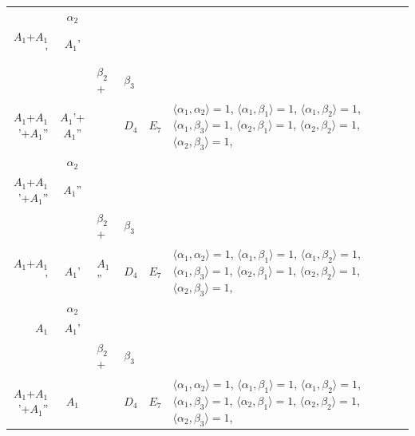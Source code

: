 \documentclass[12pt]{report}
\begin{document}
\begin{appendix}
{\begin{longtable}{rcl p{1cm}p{1cm}p{3cm} }
\\
\begin{tabular}{cc}$\alpha_1$+ & $\alpha_2$\\\tiny{ $A_1$+$A_1$' } & \tiny{ $A_1$' }\end{tabular} &\begin{tabular}{c} = \\~ \end{tabular} & \begin{tabular}{ccc}$\beta_1$+ & $\beta_2$+ & $\beta_3$\\\tiny{ $A_1$+$A_1$'+$A_1$'' } & \tiny{ $A_1$'+$A_1$'' } & \tiny{  }\end{tabular} & $D_4$ & $E_7$ & $\langle\alpha_1, \alpha_2\rangle=1$,  $\langle\alpha_1, \beta_1\rangle=1$, $\langle\alpha_1, \beta_2\rangle=1$, $\langle\alpha_1, \beta_3\rangle=1$, $\langle\alpha_2, \beta_1\rangle=1$, $\langle\alpha_2, \beta_2\rangle=1$, $\langle\alpha_2, \beta_3\rangle=1$, 
\\
\begin{tabular}{cc}$\alpha_1$+ & $\alpha_2$\\\tiny{ $A_1$+$A_1$'+$A_1$'' } & \tiny{ $A_1$'' }\end{tabular} &\begin{tabular}{c} = \\~ \end{tabular} & \begin{tabular}{ccc}$\beta_1$+ & $\beta_2$+ & $\beta_3$\\\tiny{ $A_1$+$A_1$' } & \tiny{ $A_1$' } & \tiny{ $A_1$'' }\end{tabular} & $D_4$ & $E_7$ & $\langle\alpha_1, \alpha_2\rangle=1$,  $\langle\alpha_1, \beta_1\rangle=1$, $\langle\alpha_1, \beta_2\rangle=1$, $\langle\alpha_1, \beta_3\rangle=1$, $\langle\alpha_2, \beta_1\rangle=1$, $\langle\alpha_2, \beta_2\rangle=1$, $\langle\alpha_2, \beta_3\rangle=1$, 
\\
\begin{tabular}{cc}$\alpha_1$+ & $\alpha_2$\\\tiny{ $A_1$ } & \tiny{ $A_1$' }\end{tabular} &\begin{tabular}{c} = \\~ \end{tabular} & \begin{tabular}{ccc}$\beta_1$+ & $\beta_2$+ & $\beta_3$\\\tiny{ $A_1$+$A_1$'+$A_1$'' } & \tiny{ $A_1$ } & \tiny{  }\end{tabular} & $D_4$ & $E_7$ & $\langle\alpha_1, \alpha_2\rangle=1$,  $\langle\alpha_1, \beta_1\rangle=1$, $\langle\alpha_1, \beta_2\rangle=1$, $\langle\alpha_1, \beta_3\rangle=1$, $\langle\alpha_2, \beta_1\rangle=1$, $\langle\alpha_2, \beta_2\rangle=1$, $\langle\alpha_2, \beta_3\rangle=1$, 

\end{longtable}}
\end{appendix}
\end{document}
